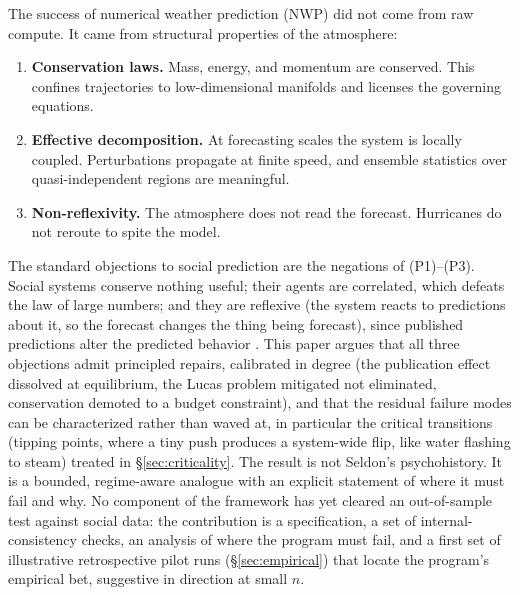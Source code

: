 \documentclass[11pt]{article}
\begin{document}
The success of numerical weather prediction (NWP) did not come from raw compute. It came from structural properties of the atmosphere:
\begin{enumerate}[label=(P\arabic*),itemsep=2pt]
\item \textbf{Conservation laws.} Mass, energy, and momentum are conserved. This confines trajectories to low-dimensional manifolds and licenses the governing equations.
\item \textbf{Effective decomposition.} At forecasting scales the system is locally coupled. Perturbations propagate at finite speed, and ensemble statistics over quasi-independent regions are meaningful.
\item \textbf{Non-reflexivity.} The atmosphere does not read the forecast. Hurricanes do not reroute to spite the model.
\end{enumerate}
The standard objections to social prediction are the negations of (P1)--(P3). Social systems conserve nothing useful; their agents are correlated, which defeats the law of large numbers; and they are reflexive (the system reacts to predictions about it, so the forecast changes the thing being forecast), since published predictions alter the predicted behavior \cite{lucas1976,goodhart1975}. This paper argues that all three objections admit principled repairs, calibrated in degree (the publication effect dissolved at equilibrium, the Lucas problem mitigated not eliminated, conservation demoted to a budget constraint), and that the residual failure modes can be characterized rather than waved at, in particular the critical transitions (tipping points, where a tiny push produces a system-wide flip, like water flashing to steam) treated in \S\ref{sec:criticality}. The result is not Seldon's psychohistory. It is a bounded, regime-aware analogue with an explicit statement of where it must fail and why. No component of the framework has yet cleared an out-of-sample test against social data: the contribution is a specification, a set of internal-consistency checks, an analysis of where the program must fail, and a first set of illustrative retrospective pilot runs (\S\ref{sec:empirical}) that locate the program's empirical bet, suggestive in direction at small $n$.
\end{document}
